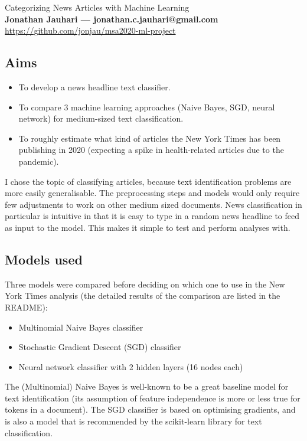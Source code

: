 \documentclass[11pt]{article}
\begin{document}
\Large{Categorizing News Articles with Machine Learning} \\[2mm]
\large\textbf{Jonathan Jauhari --- jonathan.c.jauhari@gmail.com} \\[2mm]
\url{https://github.com/jonjau/msa2020-ml-project}

\subsection*{Aims}

\begin{itemize}
    \item To develop a news headline text classifier.
    \item To compare 3 machine learning approaches (Naive Bayes, SGD, neural 
          network) for medium-sized text classification.
    \item To roughly estimate what kind of articles the New York Times has been
          publishing in 2020 (expecting a spike in health-related articles
          due to the pandemic).
\end{itemize}

I chose the topic of classifying articles, because text identification
problems are more easily generalisable. The preprocessing steps and models
would only require few adjustments to work on other medium sized documents.
News classification in particular is intuitive in that it is easy to type in
a random news headline to feed as input to the model. This makes it simple to
test and perform analyses with.

\subsection*{Models used}

Three models were compared before deciding on which one to use in the New
York Times analysis (the detailed results of the comparison are listed in the
README):

\begin{itemize}
    \item Multinomial Naive Bayes classifier
    \item Stochastic Gradient Descent (SGD) classifier
    \item Neural network classifier with 2 hidden layers (16 nodes each)
\end{itemize}

The (Multinomial) Naive Bayes is well-known to be a great baseline model for
text identification (its assumption of feature independence is more or less
true for tokens in a document). The SGD classifier is based on
optimising gradients, and is also a model that is recommended by the
scikit-learn library for text classification.
\end{document}
